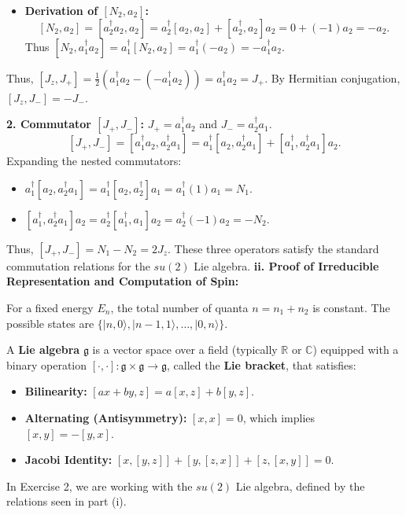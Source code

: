 \begin{solution}
\begin{itemize}
    \item \textbf{Derivation of $[N_2, a_2]$:}
    \[ [N_2, a_2] = [a_2^\dagger a_2, a_2] = a_2^\dagger [a_2, a_2] + [a_2^\dagger, a_2] a_2 = 0 + (-1)a_2 = -a_2. \]
    Thus $[N_2, a_1^\dagger a_2] = a_1^\dagger [N_2, a_2] = a_1^\dagger (-a_2) = -a_1^\dagger a_2$.
\end{itemize}
Thus, $[J_z, J_+] = \frac{1}{2} (a_1^\dagger a_2 - (-a_1^\dagger a_2)) = a_1^\dagger a_2 = J_+$.
By Hermitian conjugation, $[J_z, J_-] = -J_-$.

\textbf{2. Commutator $[J_+, J_-]$:}
$J_+ = a_1^\dagger a_2$ and $J_- = a_2^\dagger a_1$.
\[ [J_+, J_-] = [a_1^\dagger a_2, a_2^\dagger a_1] = a_1^\dagger [a_2, a_2^\dagger a_1] + [a_1^\dagger, a_2^\dagger a_1] a_2. \]
Expanding the nested commutators:
\begin{itemize}
    \item $a_1^\dagger [a_2, a_2^\dagger a_1] = a_1^\dagger [a_2, a_2^\dagger] a_1 = a_1^\dagger (1) a_1 = N_1$.
    \item $[a_1^\dagger, a_2^\dagger a_1] a_2 = a_2^\dagger [a_1^\dagger, a_1] a_2 = a_2^\dagger (-1) a_2 = -N_2$.
\end{itemize}
Thus, $[J_+, J_-] = N_1 - N_2 = 2 J_z$.
These three operators satisfy the standard commutation relations for the $su(2)$ Lie algebra.
\textbf{ii. Proof of Irreducible Representation and Computation of Spin:}

For a fixed energy $E_n$, the total number of quanta $n = n_1 + n_2$ is constant.
The possible states are $\{|n, 0\rangle, |n-1, 1\rangle, \dots, |0, n\rangle\}$.

\begin{definition}
A \textbf{Lie algebra} $\mathfrak{g}$ is a vector space over a field (typically $\mathbb{R}$ or $\mathbb{C}$) equipped with a binary operation $[\cdot, \cdot]: \mathfrak{g} \times \mathfrak{g} \to \mathfrak{g}$, called the \textbf{Lie bracket}, that satisfies:
\begin{itemize}
    \item \textbf{Bilinearity:} $[ax + by, z] = a[x, z] + b[y, z]$.
    \item \textbf{Alternating (Antisymmetry):} $[x, x] = 0$, which implies $[x, y] = -[y, x]$.
    \item \textbf{Jacobi Identity:} $[x, [y, z]] + [y, [z, x]] + [z, [x, y]] = 0$.
\end{itemize}
In Exercise 2, we are working with the $su(2)$ Lie algebra, defined by the relations seen in part (i).
\end{definition}


\end{solution}
